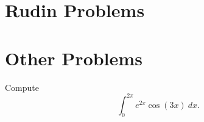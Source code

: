 \documentclass{assignment}
\begin{document}
\maketitle
\section*{Rudin Problems}
\begin{question}[6.13*]
  
\end{question}

\begin{question}[6.15*]
  
\end{question}

\begin{question}[6.17*]
  
\end{question}

\section*{Other Problems}
\begin{question}[1]
  Compute $$\int_0^{2\pi} e^{2x}\cos(3x)\ dx.$$
\end{question}
\end{document}
